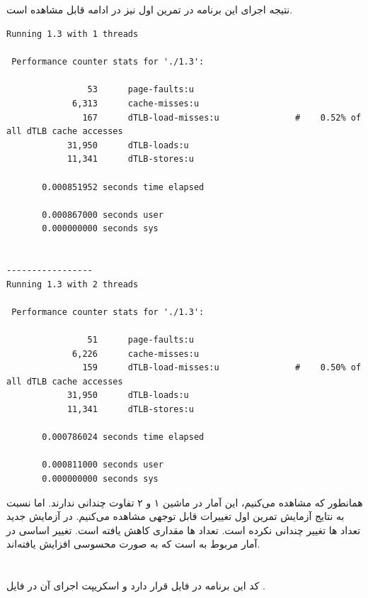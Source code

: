 \documentclass{article}
\begin{document}
\subsection{}
نتیجه اجرای این برنامه در تمرین اول نیز در ادامه قابل مشاهده است. 
\begin{latin}
\begin{lstlisting}
Running 1.3 with 1 threads

 Performance counter stats for './1.3':

                53      page-faults:u                                                         
             6,313      cache-misses:u                                                        
               167      dTLB-load-misses:u               #    0.52% of all dTLB cache accesses
            31,950      dTLB-loads:u                                                          
            11,341      dTLB-stores:u                                                         

       0.000851952 seconds time elapsed

       0.000867000 seconds user
       0.000000000 seconds sys


-----------------
Running 1.3 with 2 threads

 Performance counter stats for './1.3':

                51      page-faults:u                                                         
             6,226      cache-misses:u                                                        
               159      dTLB-load-misses:u               #    0.50% of all dTLB cache accesses
            31,950      dTLB-loads:u                                                          
            11,341      dTLB-stores:u                                                         

       0.000786024 seconds time elapsed

       0.000811000 seconds user
       0.000000000 seconds sys
\end{lstlisting}
\end{latin}
همانطور که مشاهده می‌کنیم،‌ این آمار در ماشین ۱ و ۲ تفاوت چندانی ندارند.
اما نسبت به نتایج آزمایش تمرین اول تغییرات قابل توجهی مشاهده می‌کنیم. 
در آزمایش جدید تعداد 
ها 
تغییر چندانی نکرده است. تعداد 
ها
مقداری کاهش یافته است. تغییر اساسی در آمار مربوط به 
است که به صورت محسوسی افزایش یافته‌اند.

\section{}
کد این برنامه در فایل 
قرار دارد و اسکریپت اجرای آن در فایل 
.
\end{document}
